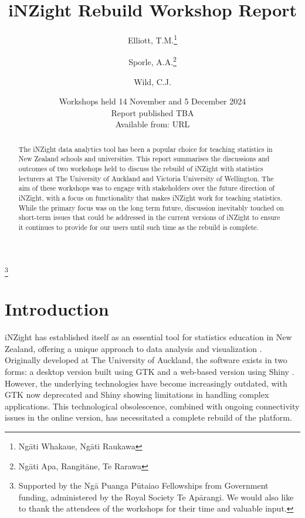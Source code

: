 \documentclass{article}
\title{iNZight Rebuild Workshop Report}
\author[1,2]{Elliott, T.M.\thanks{Ngāti Whakaue, Ngāti Raukawa}}
\author[1,2]{Sporle, A.A.\thanks{Ngāti Apa, Rangitāne, Te Rarawa}}
\author[1]{Wild, C.J.}
\affil[1]{iNZight Analytics Ltd}
\affil[2]{The University of Auckland}
\date{\small Workshops held 14 November and 5 December 2024\\
Report published TBA\\
Available from: URL
}
\begin{document}
\begin{titlepage}
    \maketitle

    \begin{abstract}
        The iNZight data analytics tool has been a popular choice for teaching statistics in New Zealand schools and universities. This report summarises the discussions and outcomes of two workshops held to discuss the rebuild of iNZight with statistics lecturers at The University of Auckland and Victoria University of Wellington. The aim of these workshops was to engage with stakeholders over the future direction of iNZight, with a focus on functionality that makes iNZight work for teaching statistics. While the primary focus was on the long term future, discussion inevitably touched on short-term issues that could be addressed in the current versions of iNZight to ensure it continues to provide for our users until such time as the rebuild is complete.
    \end{abstract}

    \vfill

    \centering
    \thanks{\noindent Supported by the Ngā Puanga Pūtaiao Fellowships from
    Government funding, administered by the Royal Society Te Apārangi. We would also like to thank the attendees of the workshops for their time and valuable input.}
    \vspace{1em}
\end{titlepage}


\section{Introduction}

iNZight has established itself as an essential tool for statistics education in New Zealand, offering a unique approach to data analysis and visualization \parencite{Wild2021,Wild2022}.
Originally developed at The University of Auckland, the software exists in two forms: a desktop version built using GTK \parencite{GTKTeam2020} and a web-based version using Shiny \parencite{Chang2021}.
However, the underlying technologies have become increasingly outdated, with GTK now deprecated and Shiny showing limitations in handling complex applications.
This technological obsolescence, combined with ongoing connectivity issues in the online version, has necessitated a complete rebuild of the platform.
\end{document}
